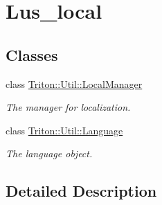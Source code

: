 \hypertarget{group__lus__local}{}\section{Lus\+\_\+local}
\label{group__lus__local}
\subsection*{Classes}
\begin{DoxyCompactItemize}
\item 
class \hyperlink{class_triton_1_1_util_1_1_local_manager}{Triton\+::\+Util\+::\+Local\+Manager}
\begin{DoxyCompactList}\small\item\em The manager for localization. \end{DoxyCompactList}\item 
class \hyperlink{class_triton_1_1_util_1_1_language}{Triton\+::\+Util\+::\+Language}
\begin{DoxyCompactList}\small\item\em The language object. \end{DoxyCompactList}\end{DoxyCompactItemize}


\subsection{Detailed Description}
